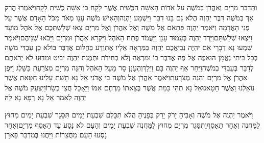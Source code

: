 \documentclass[../main/main.tex]{subfiles}
\begin{document}
\begin{multicols*}{\ncols}
וַתְּדַבֵּר מִרְיָם וְאַהֲרֹן בְּמֹשֶׁה עַל אֹדוֹת הָאִשָּׁה הַכֻּשִׁית אֲשֶׁר לָקָח כִּי אִשָּׁה כֻשִׁית לָקָח\PreVerseSpace{}וַיֹּאמְרוּ הֲרַק אַךְ בְּמֹשֶׁה דִּבֶּר יַהְוֶה הֲלֹא גַּם בָּנוּ דִבֵּר וַיִּשְׁמַע יַהְוֶה\PreVerseSpace{}וְהָאִישׁ מֹשֶׁה עָנָו מְאֹד מִכֹּל הָאָדָם אֲשֶׁר עַל פְּנֵי הָאֲדָמָה \ClosedSection{}וַיֹּאמֶר יַהְוֶה פִּתְאֹם אֶל מֹשֶׁה וְאֶל אַהֲרֹן וְאֶל מִרְיָם צְאוּ שְׁלָשְׁתְּכֶם אֶל אֹהֶל מוֹעֵד וַיֵּצְאוּ שְׁלָשְׁתָּם\PreVerseSpace{}וַיֵּרֶד יַהְוֶה בְּעַמּוּד עָנָן וַיַּעֲמֹד פֶּתַח הָאֹהֶל וַיִּקְרָא אַהֲרֹן וּמִרְיָם וַיָּבֹאוּ\SubEnd{} שְׁנֵיהֶם\PreVerseSpace{}וַיֹּאמֶר שִׁמְעוּ נָא דְבָרָי אִם יִהְיֶה נְבִיאֲכֶם יַהְוֶה בַּמַּרְאָה אֵלָיו אֶתְוַדָּע בַּחֲלוֹם אֲדַבֶּר בּוֹ\PreVerseSpace{}לֹא כֵן עַבְדִּי מֹשֶׁה בְּכָל בֵּיתִי נֶאֱמָן הוּא\PreVerseSpace{}פֶּה אֶל פֶּה אֲדַבֶּר בּוֹ וּמַרְאֶה וְלֹא בְחִידֹת וּתְמֻנַת יַהְוֶה יַבִּיט וּמַדּוּעַ לֹא יְרֵאתֶם לְדַבֵּר בְּעַבְדִּי בְמֹשֶׁה\PreVerseSpace{}וַיִּחַר אַף יַהְוֶה בָּם וַיֵּלַךְ\PreVerseSpace{}וְהֶעָנָן סָר מֵעַל הָאֹהֶל וְהִנֵּה מִרְיָם מְצֹרַעַת כַּשָּׁלֶג וַיִּפֶן אַהֲרֹן אֶל מִרְיָם וְהִנֵּה מְצֹרָעַת\PreVerseSpace{}וַיֹּאמֶר אַהֲרֹן אֶל מֹשֶׁה בִּי אֲדֹנִי אַל נָא תָשֵׁת עָלֵינוּ חַטָּאת אֲשֶׁר נוֹאַלְנוּ וַאֲשֶׁר חָטָאנוּ\PreVerseSpace{}אַל נָא תְהִי כַּמֵּת אֲשֶׁר בְּצֵאתוֹ מֵרֶחֶם אִמּוֹ וַיֵּאָכֵל חֲצִי בְשָׂרוֹ\PreVerseSpace{}וַיִּצְעַק מֹשֶׁה אֶל יַהְוֶה לֵאמֹר אֵל נָא רְפָא נָא לָהּ\OpenSection{}\par
{}וַיֹּאמֶר יַהְוֶה אֶל מֹשֶׁה וְאָבִיהָ יָרֹק יָרַק בְּפָנֶיהָ הֲלֹא תִכָּלֵם שִׁבְעַת יָמִים תִּסָּגֵר שִׁבְעַת יָמִים מִחוּץ לַמַּחֲנֶה וְאַחַר תֵּאָסֵף\PreVerseSpace{}וַתִּסָּגֵר מִרְיָם מִחוּץ לַמַּחֲנֶה שִׁבְעַת יָמִים וְהָעָם לֹא נָסַע עַד הֵאָסֵף מִרְיָם\PreVerseSpace{}וְאַחַר נָסְעוּ הָעָם מֵחֲצֵרוֹת וַיַּחֲנוּ בְּמִדְבַּר פָּארָן\OpenSection{}\par

\end{multicols*}
\end{document}
